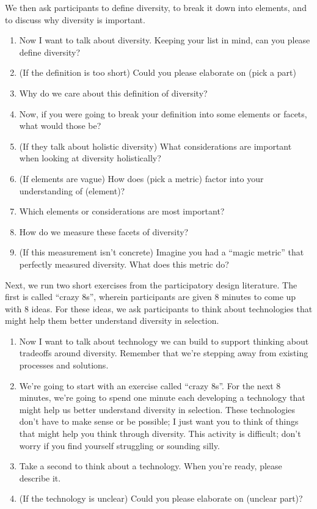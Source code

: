 We then ask participants to define diversity, to break it down into elements, and to discuss why diversity is important.

\begin{enumerate}
    \item Now I want to talk about diversity. Keeping your list in mind, can you please define diversity?
    \item (If the definition is too short) Could you please elaborate on (pick a part)
    \item Why do we care about this definition of diversity?
    \item Now, if you were going to break your definition into some elements or facets, what would those be?
    \item (If they talk about holistic diversity) What considerations are important when looking at diversity holistically?
    \item (If elements are vague) How does (pick a metric) factor into your understanding of (element)?
    \item Which elements or considerations are most important?
    \item How do we measure these facets of diversity?
    \item (If this measurement isn't concrete) Imagine you had a “magic metric” that perfectly measured diversity. What does this metric do?
\end{enumerate}

Next, we run two short exercises from the participatory design literature. The first is called ``crazy 8s'', wherein participants are given 8 minutes to come up with 8 ideas. For these ideas, we ask participants to think about technologies that might help them better understand diversity in selection.

\begin{enumerate}
    \item Now I want to talk about technology we can build to support thinking about tradeoffs around diversity. Remember that we're stepping away from existing processes and solutions.
    \item We're going to start with an exercise called “crazy 8s”. For the next 8 minutes, we're going to spend one minute each developing a technology that might help us better understand diversity in selection. These technologies don't have to make sense or be possible; I just want you to think of things that might help you think through diversity. This activity is difficult; don't worry if you find yourself struggling or sounding silly.
    \item Take a second to think about a technology. When you're ready, please describe it.
    \item (If the technology is unclear) Could you please elaborate on (unclear part)?
\end{enumerate}

